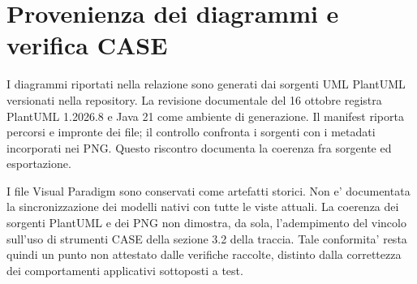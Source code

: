 \section{Provenienza dei diagrammi e verifica CASE}
I diagrammi riportati nella relazione sono generati dai sorgenti UML
PlantUML versionati nella repository. La revisione documentale del
16 ottobre registra PlantUML 1.2026.8 e Java 21 come ambiente di generazione.
Il manifest  riporta percorsi e impronte dei
file; il controllo confronta i sorgenti con i metadati incorporati nei PNG.
Questo riscontro documenta la coerenza fra sorgente ed esportazione.

I file Visual Paradigm sono conservati come artefatti storici. Non e'
documentata la sincronizzazione dei modelli nativi con tutte le viste
attuali. La coerenza dei sorgenti PlantUML e dei PNG non dimostra, da sola,
l'adempimento del vincolo sull'uso di strumenti CASE della sezione 3.2
della traccia. Tale conformita' resta quindi un punto non attestato
dalle verifiche raccolte, distinto dalla correttezza dei comportamenti
applicativi sottoposti a test.
